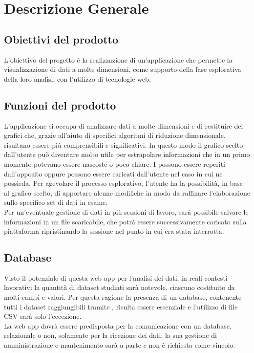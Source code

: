 \section{Descrizione Generale}
\subsection{Obiettivi del prodotto}
L'obiettivo del progetto è la realizzazione di un'applicazione che permette la visualizzazione di dati a molte dimensioni, come supporto della fase esplorativa della loro analisi, con l'utilizzo di tecnologie web.
\subsection{Funzioni del prodotto}
L'applicazione si occupa di analizzare dati a molte dimensioni e di restituire dei grafici che, grazie all'aiuto di specifici algoritmi di riduzione dimensionale, risultano essere più comprensibili e significativi. In questo modo il grafico scelto dall'utente può diventare molto utile per estrapolare informazioni che in un primo momento potevano essere nascoste o poco chiare. I  possono essere reperiti dall'apposito  oppure possono essere caricati dall'utente nel caso in cui ne possieda. Per agevolare il processo esplorativo, l'utente ha la possibilità, in base al grafico scelto, di apportare alcune modifiche in modo da raffinare l'elaborazione sullo specifico set di dati in esame.\\ Per un'eventuale gestione di dati in più sessioni di lavoro, sarà possibile salvare le informazioni in un file scaricabile, che potrà essere successivamente caricato sulla piattaforma ripristinando la sessione nel punto in cui era stata interrotta.

\subsection{Database}
Visto il potenziale di questa web app per l'analisi dei dati, in reali contesti lavorativi la quantità di dataset studiati sarà notevole, ciascuno costituito da molti campi e valori. Per questa ragione la presenza di un database, contenente tutti i dataset raggiungibili tramite , risulta essere essenziale e l'utilizzo di file CSV sarà solo l'eccezione. \\
La web app dovrà essere predisposta per la comunicazione con un database, relazionale o non, solamente per la ricezione dei dati; la sua gestione di amministrazione e mantenimento sarà a parte e non è richiesta come vincolo.

